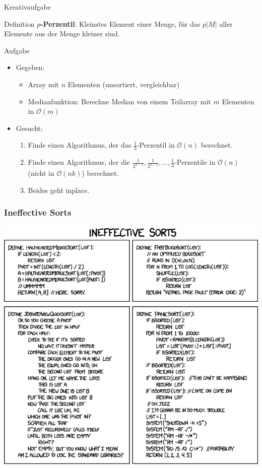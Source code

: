 \begin{frame}{Kreativaufgabe}
	\begin{block}{Definition}
		\textbf{$p$-Perzentil}: Kleinstes Element einer Menge, für das $p \vert M \vert$ aller Elemente aus der Menge kleiner sind.
	\end{block}
	\begin{block}{Aufgabe}
		\begin{itemize}
			\item Gegeben:
				\begin{itemize}
					\item Array mit $n$ Elementen (unsortiert, vergleichbar)
					\item Medianfunktion: Berechne Median von einem Teilarray mit $m$ Elementen in $\mathcal{O}(m)$
				\end{itemize}
			\item Gesucht:
				\begin{enumerate}
					\item Finde einen Algorithmus, der das $\frac{1}{3}$-Perzentil in $\mathcal{O}(n)$ berechnet.
					\item Finde einen Algorithmus, der die $\frac{1}{3^{k-1}}, \frac{1}{3^{k-2}}, \dots, \frac{1}{3}$-Perzentile in $\mathcal{O}(n)$ (nicht in $\mathcal{O}(n k)$) berechnet.
					\item Beides geht inplace.
				\end{enumerate}
		\end{itemize}
	\end{block}
\end{frame}

\begin{frame}
	\frametitle{Ineffective Sorts}
	\begin{center}
		\includegraphics[width=\textwidth,height=\textheight,keepaspectratio]{images/ineffective_sorts}
	\end{center}
\end{frame}


